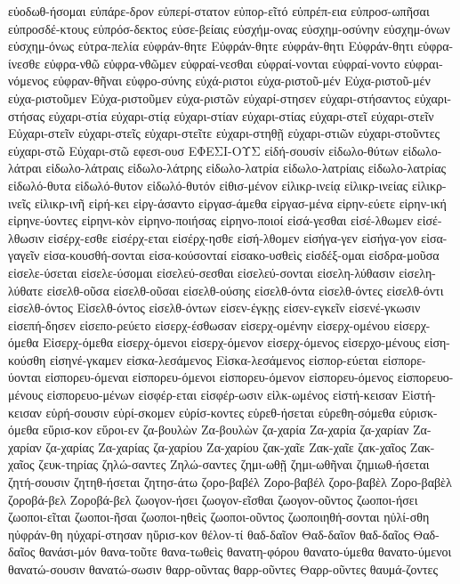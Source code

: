 {εὐοδωθ-ήσομαι
εὐπάρε-δρον
εὐπερί-στατον
εὐπορ-εῖτό
εὐπρέπ-εια
εὐπροσ-ωπῆσαι
εὐπροσδέ-κτους
εὐπρόσ-δεκτος
εὐσε-βείαις
εὐσχήμ-ονας
εὐσχημ-οσύνην
εὐσχημ-όνων
εὐσχημ-όνως
εὐτρα-πελία
εὐφράν-θητε
Εὐφράν-θητε
εὐφράν-θητι
Εὐφράν-θητι
εὐφρα-ίνεσθε
εὐφρα-νθῶ
εὐφρα-νθῶμεν
εὐφραί-νεσθαι
εὐφραί-νονται
εὐφραί-νοντο
εὐφραι-νόμενος
εὐφραν-θῆναι
εὐφρο-σύνης
εὐχά-ριστοι
εὐχα-ριστοῦ-μέν
Εὐχα-ριστοῦ-μέν
εὐχα-ριστοῦμεν
Εὐχα-ριστοῦμεν
εὐχα-ριστῶν
εὐχαρί-στησεν
εὐχαρι-στήσαντος
εὐχαρι-στήσας
εὐχαρι-στία
εὐχαρι-στίᾳ
εὐχαρι-στίαν
εὐχαρι-στίας
εὐχαρι-στεῖ
εὐχαρι-στεῖν
Εὐχαρι-στεῖν
εὐχαρι-στεῖς
εὐχαρι-στεῖτε
εὐχαρι-στηθῇ
εὐχαρι-στιῶν
εὐχαρι-στοῦντες
εὐχαρι-στῶ
Εὐχαρι-στῶ
εφεσι-ουσ
ΕΦΕΣΙ-ΟΥΣ
εἰδή-σουσίν
εἰδωλο-θύτων
εἰδωλο-λάτραι
εἰδωλο-λάτραις
εἰδωλο-λάτρης
εἰδωλο-λατρία
εἰδωλο-λατρίαις
εἰδωλο-λατρίας
εἰδωλό-θυτα
εἰδωλό-θυτον
εἰδωλό-θυτόν
εἰθισ-μένον
εἰλικρ-ινείᾳ
εἰλικρ-ινείας
εἰλικρ-ινεῖς
εἰλικρ-ινῆ
εἰρή-κει
εἰργ-άσαντο
εἰργασ-άμεθα
εἰργασ-μένα
εἰρην-εύετε
εἰρην-ική
εἰρηνε-ύοντες
εἰρηνι-κὸν
εἰρηνο-ποιήσας
εἰρηνο-ποιοί
εἰσά-γεσθαι
εἰσέ-λθωμεν
εἰσέ-λθωσιν
εἰσέρχ-εσθε
εἰσέρχ-εται
εἰσέρχ-ησθε
εἰσή-λθομεν
εἰσήγα-γεν
εἰσήγα-γον
εἰσα-γαγεῖν
εἰσα-κουσθή-σονται
εἰσα-κούσονταί
εἰσακο-υσθεὶς
εἰσδέξ-ομαι
εἰσδρα-μοῦσα
εἰσελε-ύσεται
εἰσελε-ύσομαι
εἰσελεύ-σεσθαι
εἰσελεύ-σονται
εἰσελη-λύθασιν
εἰσελη-λύθατε
εἰσελθ-οῦσα
εἰσελθ-οῦσαι
εἰσελθ-ούσης
εἰσελθ-όντα
εἰσελθ-όντες
εἰσελθ-όντι
εἰσελθ-όντος
Εἰσελθ-όντος
εἰσελθ-όντων
εἰσεν-έγκῃς
εἰσεν-εγκεῖν
εἰσενέ-γκωσιν
εἰσεπή-δησεν
εἰσεπο-ρεύετο
εἰσερχ-έσθωσαν
εἰσερχ-ομένην
εἰσερχ-ομένου
εἰσερχ-όμεθα
Εἰσερχ-όμεθα
εἰσερχ-όμενοι
εἰσερχ-όμενον
εἰσερχ-όμενος
εἰσερχο-μένους
εἰση-κούσθη
εἰσηνέ-γκαμεν
εἰσκα-λεσάμενος
Εἰσκα-λεσάμενος
εἰσπορ-εύεται
εἰσπορε-ύονται
εἰσπορευ-όμεναι
εἰσπορευ-όμενοι
εἰσπορευ-όμενον
εἰσπορευ-όμενος
εἰσπορευο-μένους
εἰσπορευο-μένων
εἰσφέρ-εται
εἰσφέρ-ωσιν
εἱλκ-ωμένος
εἱστή-κεισαν
Εἱστή-κεισαν
εὑρή-σουσιν
εὑρί-σκομεν
εὑρίσ-κοντες
εὑρεθ-ήσεται
εὑρεθη-σόμεθα
εὑρισκ-όμεθα
εὕρισ-κον
εὕροι-εν
ζα-βουλὼν
Ζα-βουλὼν
ζα-χαρία
Ζα-χαρία
ζα-χαρίαν
Ζα-χαρίαν
ζα-χαρίας
Ζα-χαρίας
ζα-χαρίου
Ζα-χαρίου
ζακ-χαῖε
Ζακ-χαῖε
ζακ-χαῖος
Ζακ-χαῖος
ζευκ-τηρίας
ζηλώ-σαντες
Ζηλώ-σαντες
ζημι-ωθῇ
ζημι-ωθῆναι
ζημιωθ-ήσεται
ζητή-σουσιν
ζητηθ-ήσεται
ζητησ-άτω
ζορο-βαβέλ
Ζορο-βαβέλ
ζορο-βαβὲλ
Ζορο-βαβὲλ
ζοροβά-βελ
Ζοροβά-βελ
ζωογον-ήσει
ζωογον-εῖσθαι
ζωογον-οῦντος
ζωοποι-ήσει
ζωοποι-εῖται
ζωοποι-ῆσαι
ζωοποι-ηθεὶς
ζωοποι-οῦντος
ζωοποιηθή-σονται
ηὐλί-σθη
ηὐφράν-θη
ηὐχαρί-στησαν
ηὕρισ-κον
θέλον-τί
θαδ-δαῖον
Θαδ-δαῖον
θαδ-δαῖος
Θαδ-δαῖος
θανάσι-μόν
θανα-τοῦτε
θανα-τωθεὶς
θανατη-φόρου
θανατο-ύμεθα
θανατο-ύμενοι
θανατώ-σουσιν
θανατώ-σωσιν
θαρρ-οῦντας
θαρρ-οῦντες
Θαρρ-οῦντες
θαυμά-ζοντες
}
